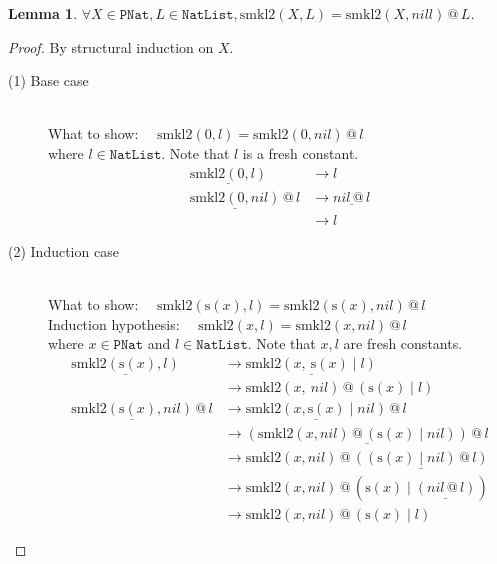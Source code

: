 \documentclass[12pt, a4paper]{article}
\newtheorem{lemma}[theorem]{Lemma}
\newcommand{\rel}[1]{\mathrel{#1}}
\newcommand{\rmx}[1]{\mathrm{#1}}
\newcommand{\larrow}{\longrightarrow}
\newcommand{\under}{\underline}
\begin{document}
\begin{lemma}
\label{lm2}
$\forall X \in \mathtt{PNat}, L \in \mathtt{NatList}, \rmx{smkl2}(X, L) = \rmx{smkl2}(X, nill) \rel{@} L$.
\end{lemma}
\begin{proof}
By structural induction on $X$.

\begin{description}

\item[(1) Base case]~\\
\noindent
What to show: $\quad\rmx{smkl2}(0, l) = \rmx{smkl2}(0, nil) \rel{@} l$ \\
where $l \in \mathtt{NatList}$. Note that $l$ is a fresh constant.
\begin{align*}
\under{\rmx{smkl2}(0, l)}
	&\larrow l \tag{by smkl2-1} \\
\under{\rmx{smkl2}(0, nil)} \rel{@} l 
	&\larrow \under{nil \rel{@} l} \tag{by smkl2-1} \\
	&\larrow l \tag{by @1}
\end{align*}

\item[(2) Induction case]~\\
What to show: $\quad\rmx{smkl2}(\rmx{s}(x), l) = \rmx{smkl2}(\rmx{s}(x), nil) \rel{@} l$ \\
Induction hypothesis: $\quad\rmx{smkl2}(x, l) = \rmx{smkl2}(x, nil) \rel{@} l$ \\
where $x \in \mathtt{PNat}$ and $l \in \mathtt{NatList}$. Note that $x, l$ are fresh constants.
\begin{align*}
\under{\rmx{smkl2}(\rmx{s}(x), l)} 
	&\larrow \under{\rmx{smkl2}(x,\ \rmx{s}(x) \rel{|} l)} \tag{by smkl2-2} \\
	&\larrow \rmx{smkl2}(x,\ nil) \rel{@} (\rmx{s}(x) \rel{|} l) \tag{by IH} \\
\under{\rmx{smkl2}(\rmx{s}(x), nil)} \rel{@} l
	&\larrow \under{\rmx{smkl2}(x, \rmx{s}(x) \rel{|} nil)} \rel{@} l \tag{by smkl2-2} \\
	&\larrow \under{(\rmx{smkl2}(x, nil) \rel{@} (\rmx{s}(x) \rel{|} nil)) \rel{@} l} \tag{by IH} \\
	&\larrow \rmx{smkl2}(x, nil) \rel{@} \under{((\rmx{s}(x) \rel{|} nil) \rel{@} l)} \tag{by assoc@} \\
	&\larrow \rmx{smkl2}(x, nil) \rel{@} (\rmx{s}(x) \rel{|} \under{(nil \rel{@} l)}) \tag{by @2} \\
	&\larrow \rmx{smkl2}(x, nil) \rel{@} (\rmx{s}(x) \rel{|} l) \tag{by @1}
\end{align*}

\end{description}
\end{proof}
\end{document}

